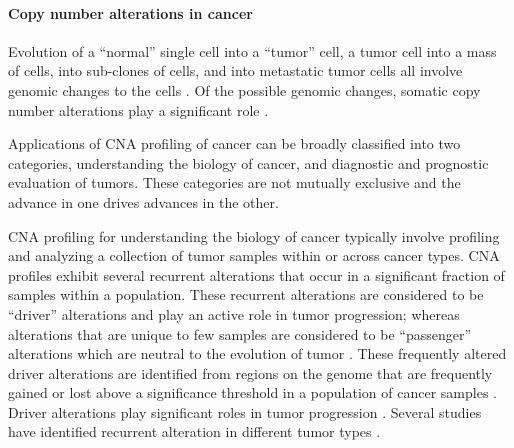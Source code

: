 \paragraph{Copy number alterations in cancer}
Evolution of a ``normal'' single cell into a ``tumor'' cell, a tumor
cell into a mass of cells, into sub-clones of cells, and into metastatic
tumor cells all involve genomic changes to the cells
\citep{stratton2009cancer}. Of the possible genomic changes, somatic copy
number alterations play a significant role
\citep{beroukhim2010landscape,zack2013pan}.

Applications of CNA profiling of cancer can be broadly classified into
two categories, understanding the biology of cancer, and diagnostic and
prognostic evaluation of tumors. These categories are not mutually
exclusive and the advance in one drives advances in the other.

CNA profiling for understanding the biology of cancer typically involve
profiling and analyzing a collection of tumor samples within or across
cancer types.
%
CNA profiles exhibit several recurrent alterations that occur in a
significant fraction of samples within a population. These recurrent
alterations are considered to be ``driver'' alterations and play an
active role in tumor progression; whereas alterations that are unique to
few samples are considered to be ``passenger'' alterations which are
neutral to the evolution of tumor \citep{bignell2010signatures,
beroukhim2010landscape}.
%
These frequently altered driver alterations are identified from regions
on the genome that are frequently gained or lost above a significance
threshold in a population of cancer samples \citep{mermel2011gistic2}.
%
Driver alterations play significant roles in tumor progression
\citep{bignell2010signatures, beroukhim2010landscape}.  Several studies
have identified recurrent alteration in different tumor types
\citep{beroukhim2007assessing,etemadmoghadam2009integrated,
weir2007characterizing,lin2008modeling}.



